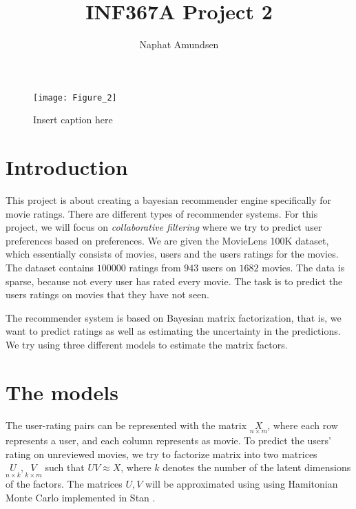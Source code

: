 \documentclass[12pt]{article}
\begin{document}
\title{\textbf{INF367A Project 2}}
\author{Naphat Amundsen}
\maketitle
\sectionfont{\fontsize{14}{15}\selectfont}
\subsectionfont{\fontsize{12}{15}\selectfont}
\subsubsectionfont{\fontsize{12}{15}\selectfont}
\graphicspath{ {./images/} }

\ifx
\begin{figure}[H]
	\centering
	\texttt{[image: Figure\_2]}
	\caption{Insert caption here}
\end{figure}
\fi

\newcommand{\opGamma}{\operatorname{Gamma}}
\newcommand{\Um}{\underset{n \times k}{U}}
\newcommand{\Vm}{\underset{k \times m}{V}}

\section*{Introduction}
    This project is about creating a bayesian recommender engine specifically for movie ratings. There are different types of recommender systems. For this project, we will focus on \textit{collaborative filtering} where we try to predict user preferences based on preferences. We are given the MovieLens 100K dataset, which essentially consists of movies, users and the users ratings for the movies. The dataset contains $100 000$ ratings from $943$ users on $1682$ movies. The data is sparse, because not every user has rated every movie. The task is to predict the users ratings on movies that they have not seen. 

    The recommender system is based on Bayesian matrix factorization, that is, we want to predict ratings as well as estimating the uncertainty in the predictions. We try using three different models to estimate the matrix factors.

\section{The models}
    The user-rating pairs can be represented with the matrix $\underset{n \times m}{X}$, where each row represents a user, and each column represents as movie. To predict the users' rating on unreviewed movies, we try to factorize matrix into two matrices $\underset{n \times k}{U}, \underset{k \times m}{V}$ such that $UV \approx X$, where $k$ denotes the number of the latent dimensions of the factors. The matrices $U,V$ will be approximated using using Hamitonian Monte Carlo implemented in Stan \cite{HMC}.
\end{document}
